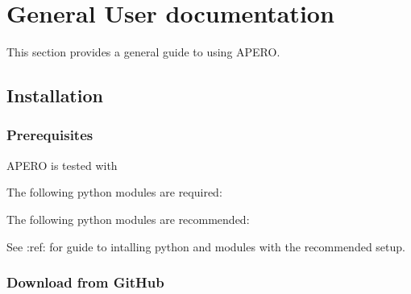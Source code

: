 \documentclass[a4paper,10pt,english]{report}
\begin{document}
\section{General User documentation}
\label{\detokenize{user/general_guide:general-user-documentation}}\label{\detokenize{user/general_guide:general-guide}}\label{\detokenize{user/general_guide::doc}}
This section provides a general guide to using APERO.


\subsection{Installation}
\label{\detokenize{user/general/installation:installation}}\label{\detokenize{user/general/installation:id1}}\label{\detokenize{user/general/installation::doc}}

\subsubsection{Prerequisites}
\label{\detokenize{user/general/installation:prerequisites}}\label{\detokenize{user/general/installation:installation-prerequisites}}
APERO is tested with 

The following python modules are required:

\begin{sphinxVerbatim}[commandchars=\\\{\}]
\end{sphinxVerbatim}

The following python modules are recommended:

\begin{sphinxVerbatim}[commandchars=\\\{\}]
\end{sphinxVerbatim}

See :ref:  for guide to intalling python and modules with
the recommended setup.


\subsubsection{Download from GitHub}
\label{\detokenize{user/general/installation:download-from-github}}\label{\detokenize{user/general/installation:installation-download}}
\end{document}

